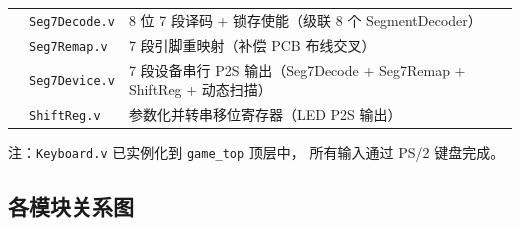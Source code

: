\documentclass[12pt,a4paper]{ctexart}
\begin{document}
\begin{table}[H]
\begin{tabular}{llp{5.5cm}}
                        & \texttt{Seg7Decode.v} & 8 位 7 段译码 + 锁存使能（级联 8 个 SegmentDecoder） \\
                        & \texttt{Seg7Remap.v} & 7 段引脚重映射（补偿 PCB 布线交叉） \\
                        & \texttt{Seg7Device.v} & 7 段设备串行 P2S 输出（Seg7Decode + Seg7Remap + ShiftReg + 动态扫描） \\
                        & \texttt{ShiftReg.v} & 参数化并转串移位寄存器（LED P2S 输出） \\
\bottomrule
\end{tabular}
\end{table}

注：\texttt{Keyboard.v} 已实例化到 \texttt{game\_top} 顶层中，
所有输入通过 PS/2 键盘完成。

\subsection{各模块关系图}
\end{document}
